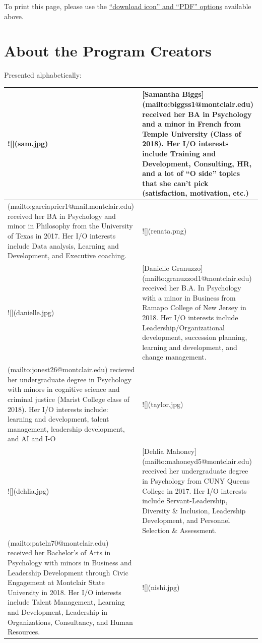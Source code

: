 \documentclass[
  openany]{book}
\begin{document}
To print this page, please use the \href{snip.png}{``download icon'' and ``PDF'' options} available above.

\hypertarget{authors}{%
\chapter{About the Program Creators}\label{authors}}

Presented alphabetically:

\begin{tabular}{l|l}
\hline
![](sam.jpg) & [Samantha Biggs](mailto:biggss1@montclair.edu) received her BA in Psychology and a minor in French from Temple University (Class of 2018). Her I/O interests include Training and Development, Consulting, HR, and a lot of “O side” topics that she can’t pick (satisfaction, motivation, etc.)\\
\hline
[Renata Garcia Prieto Palacios Roji](mailto:garciaprier1@mail.montclair.edu) received her  BA in Psychology and minor in Philosophy from the University of Texas in 2017. Her I/O interests include Data analysis, Learning and Development, and Executive coaching. & ![](renata.png)\\
\hline
![](danielle.jpg) & [Danielle Granuzzo](mailto:granuzzod1@montclair.edu) received her B.A. In Psychology with a minor in Business from Ramapo College of New Jersey in 2018. Her I/O interests include Leadership/Organizational development, succession planning, learning and development, and change management.\\
\hline
[Taylor Jones](mailto:jonest26@montclair.edu) recieved her undergraduate degree in Psychology with minors in cognitive science and criminal justice (Marist College class of 2018). Her I/O interests include: learning and development, talent management,  leadership development, and AI and I-O & ![](taylor.jpg)\\
\hline
![](dehlia.jpg) & [Dehlia Mahoney](mailto:mahoneyd5@montclair.edu) received her undergraduate degree in Psychology from CUNY Queens College in 2017. Her I/O interests include  Servant-Leadership, Diversity \& Inclusion, Leadership Development, and Personnel Selection \& Assessment.\\
\hline
[Nishi Patel](mailto:pateln70@montclair.edu) received her Bachelor’s of Arts in Psychology with minors in Business and Leadership Development through Civic Engagement at Montclair State University in 2018. Her I/O interests include Talent Management, Learning and Development, Leadership in Organizations, Consultancy, and Human Resources. & ![](nishi.jpg)\\

\end{tabular}
\end{document}
